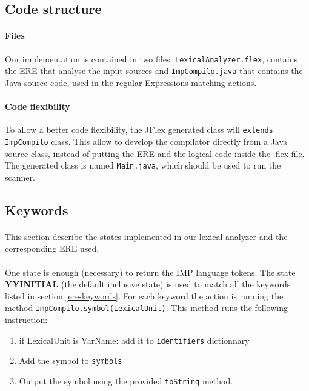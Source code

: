 \documentclass[letterpaper]{article}
\begin{document}
\subsection{Code structure}

\paragraph{Files}

Our implementation is contained in two files: \texttt{LexicalAnalyzer.flex},
contains the ERE that analyse the input sources and \texttt{ImpCompilo.java}
that contains the Java source code, used in the regular Expressions
matching actions.


\paragraph{Code flexibility}

To allow a better code flexibility, the JFlex generated class will
\texttt{extends} \texttt{ImpCompilo} class. This allow to develop the
compilator directly from a Java source class, instead of putting the
ERE and the logical code inside the .flex file. The generated class is named
\texttt{Main.java}, which should be used to run the scanner.

\subsection{Keywords}

\label{impl-keywords}

\paragraph{}

This section describe the states implemented in our
lexical analyzer and the corresponding ERE used.

\paragraph{}

One state is enough (necessary) to return the IMP language tokens.
The state \textbf{YYINITIAL} (the default inclusive state) is used to match
all the keywords listed in section \ref{ere-keywords}. For each keyword
the action is running the method \texttt{ImpCompilo.symbol(LexicalUnit)}.
This method runs the following instruction:
\begin{enumerate}
    \item if LexicalUnit is VarName: add it to \texttt{identifiers} dictionnary
    \item Add the symbol to \texttt{symbols}
    \item Output the symbol using the provided \texttt{toString} method.
\end{enumerate}
\end{document}
